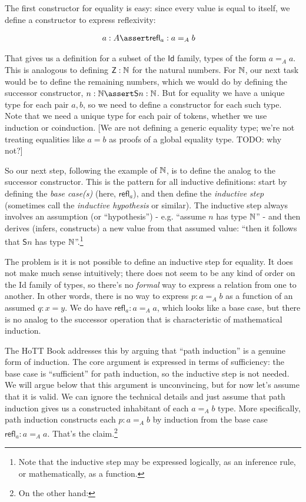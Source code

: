 \documentclass{article}
\begin{document}
The first constructor for equality is easy: since every value is equal
to itself, we define a constructor to express reflexivity:

\begin{align}
  & a:A\linfer\textsf{refl}_a: a=_Ab
\end{align}

That gives us a definition for a subset of the \(\textsf{Id}\) family,
types of the form \(a=_A a\). This is analogous to defining
\(\textsf{Z}: \mathbb{N}\) for the natural numbers. For \(\mathbb{N}\), our next
task would be to define the remaining numbers, which we would do by
defining the successor constructor, \(n:\Nat\linfer \textsf{S}n:\Nat\).
But for equality we have a unique type for each pair \(a,b\), so we
need to define a constructor for each such type. Note that we need a unique
type for each pair of tokens, whether we use induction or coinduction.
[We are not defining a generic equality type; we're not treating
  equalities like \(a=b\) as proofs of a global equality type. TODO:
  why not?]

So our next step, following the example of \(\mathbb{N}\), is to define the
analog to the successor constructor. This is the pattern for all
inductive definitions: start by defining the \textit{base case(s)}
(here, \(\textsf{refl}_a\)), and then define the \textit{inductive
  step} (sometimes call the \textit{inductive hypothesis} or similar).
The inductive step always involves an assumption (or ``hypothesis'') -
e.g. ``assume \(n\) has type \(\mathbb{N}\)'' - and then derives (infers,
constructs) a new value from that assumed value: ``then it follows
that \(\textsf{S}n\) has type \(\mathbb{N}\)''.\footnote{Note that the
inductive step may be expressed logically, as an inference rule, or
mathematically, as a function.}

The problem is it is not possible to define an inductive step for
equality. It does not make much sense intuitively; there does not seem
to be any kind of order on the \textsf{Id} family of types, so there's
no \textit{formal} way to express a relation from one to another. In
other words, there is no way to express \(p:a=_A b\) as a function of
an assumed \(q:x=y\). We do have \(\textsf{refl}_a:a=_A a\), which
looks like a base case, but there is no analog to the successor
operation that is characteristic of mathematical induction.

The HoTT Book addresses this by arguing that ``path induction'' is a
genuine form of induction. The core argument is expressed in terms of
sufficiency: the base case is ``sufficient'' for path induction, so
the inductive step is not needed. We will argue below that this
argument is unconvincing, but for now let's assume that it is valid.
We can ignore the technical details and just assume that path
induction gives us a constructed inhabitant of each \(a=_A b\) type.
More specifically, path induction constructs each \(p:a=_A b\) by
induction from the base case \(\textsf{refl}_a:a=_A a\). That's the
claim.\footnote{On the other hand: }
\end{document}
